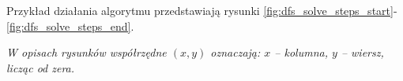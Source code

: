 \documentclass[../../../../doc.tex]{subfiles}
\begin{document}
\noindent Przykład działania algorytmu przedstawiają rysunki \ref{fig:dfs_solve_steps_start}-\ref{fig:dfs_solve_steps_end}.

\vspace{4pt}
\noindent \textit{W opisach rysunków współrzędne \( (x, y) \) oznaczają: \( x \) – kolumna, \( y \) – wiersz, licząc od zera.}

  
\end{document}
